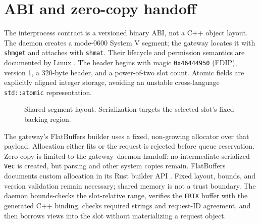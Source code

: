 \documentclass[10pt,a4paper,twocolumn]{article}
\newcommand{\code}[1]{\texttt{#1}}
\begin{document}
\section{ABI and zero-copy handoff}
The interprocess contract is a versioned binary ABI, not a C++ object layout.
The daemon creates a mode-0600 System V segment; the gateway locates it with
\code{shmget} and attaches with \code{shmat}. Their lifecycle and permission
semantics are documented by Linux \cite{linuxshmget,linuxshmat}. The header begins
with magic \code{0x46444950} (FDIP), version 1, a 320-byte header, and a
power-of-two slot count. Atomic fields are explicitly aligned integer storage,
avoiding an unstable cross-language \code{std::atomic} representation.

\begin{figure}[t]\centering
{}
\caption{Shared segment layout. Serialization targets the selected slot's fixed backing region.}\label{fig:abi}
\end{figure}

The gateway's FlatBuffers builder uses a fixed, non-growing allocator over that
payload. Allocation either fits or the request is rejected before queue
reservation. Zero-copy is limited to the gateway--daemon handoff: no intermediate
serialized \code{Vec} is created, but parsing and other system copies remain.
FlatBuffers documents custom allocation in its Rust builder API
\cite{flatbuffersrust}. Fixed layout, bounds, and version validation remain
necessary; shared memory is not a trust boundary. The daemon bounds-checks the
slot-relative range, verifies the \code{FRTX} buffer with the generated C++
binding, checks required strings and request-ID agreement, and then borrows
views into the slot without materializing a request object.
\end{document}
